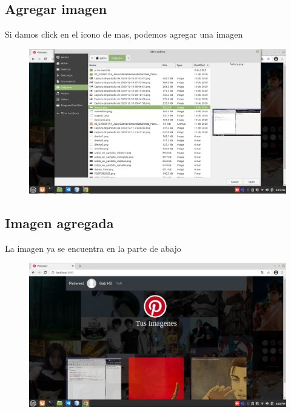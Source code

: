 \documentclass[60pt]{article}
\begin{document}
\subsection{Agregar imagen}
Si damos click en el icono de mas, podemos agregar una imagen
\begin{figure}[htb]
\centering
\includegraphics[width=1\linewidth]{agregar.png}
\end{figure}

\subsection{Imagen agregada}
La imagen ya se encuentra en la parte de abajo
\begin{figure}[htb]
\centering
\includegraphics[width=1\linewidth]{imagenAgregada.png}
\end{figure}

\newpage
\end{document}
